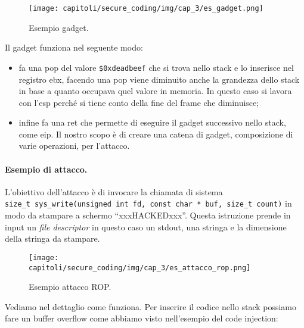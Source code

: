 \begin{figure}[H]
    \centering
    \texttt{[image: capitoli/secure\_coding/img/cap\_3/es\_gadget.png]}
    \caption{Esempio gadget.}\label{fig:es_gadget}
\end{figure}

Il gadget funziona nel seguente modo:

\begin{itemize}
    \item fa una pop del valore \verb|$0xdeadbeef| che si trova nello stack e lo
          inserisce nel registro ebx, facendo una pop viene diminuito anche la grandezza
          dello stack in base a quanto occupava quel valore in memoria. In questo caso si
          lavora con l'esp perché si tiene conto della fine del frame che diminuisce;
    \item infine fa una ret che permette di eseguire il gadget successivo nello stack,
          come eip. Il nostro scopo è di creare una catena di gadget, composizione di varie
          operazioni, per l'attacco.
\end{itemize}

\paragraph{Esempio di attacco.}
L'obiettivo dell'attacco è di invocare la chiamata di sistema \\
\verb|size_t sys_write(unsigned int fd, const char * buf, size_t count)|
in modo da stampare a schermo ``xxxHACKEDxxx''. Questa istruzione prende in input
un \textit{file descriptor} in questo caso un stdout, una stringa e la dimensione
della stringa da stampare.

\begin{figure}[H]
    \centering
    \texttt{[image: capitoli/secure\_coding/img/cap\_3/es\_attacco\_rop.png]}
    \caption{Esempio attacco ROP.}\label{fig:es_attacco_rop}
\end{figure}

Vediamo nel dettaglio come funziona. Per inserire il codice nello stack possiamo
fare un buffer overflow come abbiamo visto nell'esempio del code injection:

